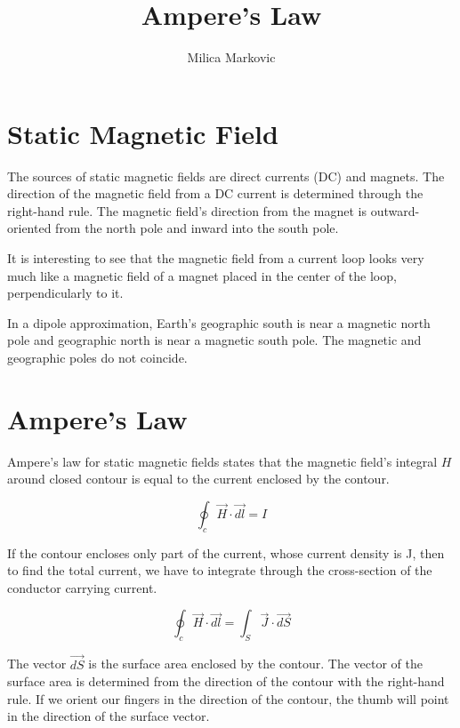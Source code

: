 \documentclass{ximera}
\title{Ampere's Law}
\author{Milica Markovic}
\begin{document}
  
\begin{abstract}  

\end{abstract}  
\maketitle    






\section{Static Magnetic Field}

The sources of static magnetic fields are direct currents (DC) and magnets. The direction of the magnetic field from a DC current is determined through the right-hand rule. The magnetic field's direction from the magnet is outward-oriented from the north pole and inward into the south pole.

It is interesting to see that the magnetic field from a current loop looks very much like a magnetic field of a magnet placed in the center of the loop, perpendicularly to it. 

In a dipole approximation, Earth's geographic south is near a magnetic north pole and geographic north is near a magnetic south pole. The magnetic and geographic poles do not coincide.


\section{Ampere's Law}


Ampere's law for static magnetic fields states that the magnetic field's integral $H$ around closed contour is equal to the current enclosed by the contour.

\begin{equation}
\oint_c \vec{H} \cdot \vec{dl} = I
\end{equation}


If the contour encloses only part of the current, whose current density is J, then to find the total current, we have to integrate through the cross-section of the conductor carrying current.


\begin{equation}
\oint_c \vec{H} \cdot \vec{dl} = \int_S \vec{J} \cdot \vec{dS}
\end{equation}


The vector $\vec{dS}$ is the surface area enclosed by the contour. The vector of the surface area is determined from the direction of the contour with the right-hand rule. If we orient our fingers in the direction of the contour, the thumb will point in the direction of the surface vector.
\end{document}
